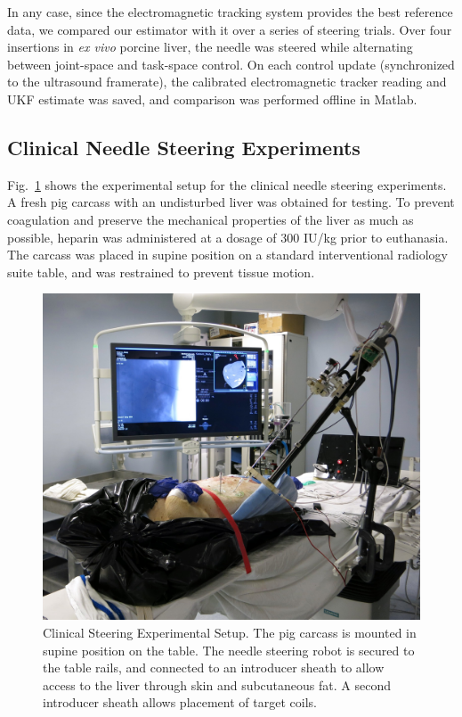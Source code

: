 In any case, since the electromagnetic tracking system provides the best reference data, we compared our estimator with it over a series of steering trials. Over four insertions in \textit{ex vivo} porcine liver, the needle was steered while alternating between joint-space and task-space control. On each control update (synchronized to the ultrasound framerate), the calibrated electromagnetic tracker reading and UKF estimate was saved, and comparison was performed offline in Matlab.

\subsection{Clinical Needle Steering Experiments}
Fig.~\ref{fig:CadaverSetup} shows the experimental setup for the clinical needle steering experiments. A fresh pig carcass with an undisturbed liver was obtained for testing. To prevent coagulation and preserve the mechanical properties of the liver as much as possible, heparin was administered at a dosage of 300 IU/kg prior to euthanasia. The carcass was placed in supine position on a standard interventional radiology suite table, and was restrained to prevent tissue motion. 

\begin{figure}[!t]
\centering
\includegraphics[width = \columnwidth]{./Images/Chapter5/CadaverSetup/CadaverSetup.jpg}%
\caption[Clinical Needle Steering Experimental Setup]{Clinical Steering Experimental Setup. The pig carcass is mounted in supine position on the table. The needle steering robot is secured to the table rails, and connected to an introducer sheath to allow access to the liver through skin and subcutaneous fat. A second introducer sheath allows placement of target coils.}
\label{fig:CadaverSetup}
\end{figure}  

